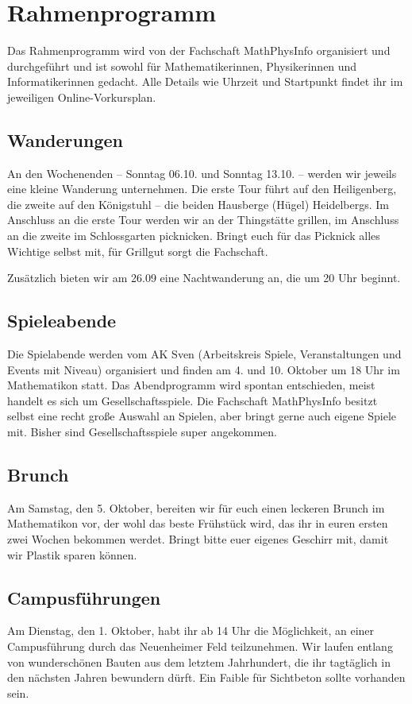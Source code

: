 \newpage
\section{Rahmenprogramm}
\label{vorkurs-rahmenprogramm}

Das Rahmenprogramm wird von der Fachschaft MathPhysInfo organisiert und durchgeführt und ist sowohl für Mathematikerinnen, Physikerinnen und Informatikerinnen gedacht. Alle Details wie Uhrzeit und Startpunkt findet ihr im jeweiligen Online-Vorkursplan.

\subsection{Wanderungen}
An den Wochenenden -- Sonntag 06.10. und Sonntag 13.10. -- werden wir jeweils eine kleine Wanderung unternehmen. Die erste Tour führt auf den Heiligenberg, die zweite auf den Königstuhl -- die beiden Hausberge (Hügel) Heidelbergs. Im Anschluss an die erste Tour werden wir an der Thingstätte grillen, im Anschluss an die zweite im Schlossgarten picknicken. Bringt euch für das Picknick alles Wichtige selbst mit, für Grillgut sorgt die Fachschaft.

Zusätzlich bieten wir am 26.09 eine Nachtwanderung an, die um 20 Uhr beginnt.

\subsection{Spieleabende}
Die Spielabende werden vom AK Sven (Arbeitskreis Spiele, Veranstaltungen und Events mit Niveau) organisiert und finden am 4. und 10. Oktober um 18 Uhr im \gls{Mathematikon} statt. Das Abendprogramm wird spontan entschieden, meist handelt es sich um Gesellschaftsspiele. Die Fachschaft MathPhysInfo besitzt selbst eine recht große Auswahl an Spielen, aber bringt gerne auch eigene Spiele mit. Bisher sind Gesellschaftsspiele super angekommen.

\subsection{Brunch}
Am Samstag, den 5. Oktober, bereiten wir für euch einen leckeren Brunch im \gls{Mathematikon} vor, der wohl das beste Frühstück wird, das ihr in euren ersten zwei Wochen bekommen werdet. Bringt bitte euer eigenes Geschirr mit, damit wir Plastik sparen können.

\subsection{Campusführungen}
Am Dienstag, den 1. Oktober, habt ihr ab 14 Uhr die Möglichkeit, an einer Campusführung durch das Neuenheimer Feld teilzunehmen. Wir laufen entlang von wunderschönen Bauten aus dem letztem Jahrhundert, die ihr tagtäglich in den nächsten Jahren bewundern dürft. Ein Faible für Sichtbeton sollte vorhanden sein.

